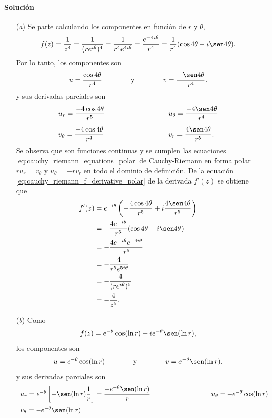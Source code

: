 \documentclass[a4paper]{report}
\begin{document}
\paragraph{Solución} 
\begin{enumerate}
 \item[(\textit{a})] Se parte calculando los componentes en función de \(r\) y \(\theta\),
  \[
   f(z)=\frac{1}{z^4}=\frac{1}{(re^{i\theta})^4}=\frac{1}{r^4e^{4i\theta}}
    =\frac{e^{-4i\theta}}{r^4}=\frac{1}{r^4}(\cos4\theta-i\sen4\theta).
  \]
  Por lo tanto, los componentes son
  \[
  u=\frac{\cos4\theta}{r^4}
  \qquad\qquad\textrm{y}\qquad\qquad
  v=\frac{-\sen4\theta}{r^4}.
 \]
 y sus derivadas parciales son 
 \[
 \begin{array}{ll}
  u_r=\dfrac{-4\cos4\theta}{r^5}
  \qquad\qquad\qquad\qquad&
  u_\theta=\dfrac{-4\sen4\theta}{r^4}\\[\bigskipamount]
  v_\theta=\dfrac{-4\cos4\theta}{r^4}
  \qquad\qquad\qquad\qquad&
  v_r=\dfrac{4\sen4\theta}{r^5}.
 \end{array}
 \]
 Se observa que son funciones continuas y se cumplen las ecuaciones \ref{eq:cauchy_riemann_equations_polar} de Cauchy-Riemann en forma polar \(ru_r=v_\theta\) y \(u_\theta=-rv_r\) en todo el dominio de definición. De la ecuación \ref{eq:cauchy_riemann_f_derivative_polar} de la derivada \(f'(z)\) se obtiene que 
 \begin{align*}
  f'(z)&=e^{-i\theta}\left(-\frac{4\cos4\theta}{r^5}+i\frac{4\sen4\theta}{r^5}\right)\\
   &=-\frac{4e^{-i\theta}}{r^5}(\cos4\theta-i\sen4\theta)\\
   &=-\frac{4e^{-i\theta}e^{-4i\theta}}{r^5}\\
   &=-\frac{4}{r^5e^{5i\theta}}\\
   &=-\frac{4}{(re^{i\theta})^5}\\
   &=-\frac{4}{z^5}.
 \end{align*}
 \item[(\textit{b})] Como
 \[
  f(z)=e^{-\theta}\cos(\ln r)+ie^{-\theta}\sen(\ln r),
 \]
 los componentes son
 \[
  u=e^{-\theta}\cos(\ln r)
  \qquad\qquad\textrm{y}\qquad\qquad
  v=e^{-\theta}\sen(\ln r).
 \]
 y sus derivadas parciales son 
 \[
 \begin{array}{ll}
  u_r=e^{-\theta}\left[-\sen(\ln r)\dfrac{1}{r}\right]=\dfrac{-e^{-\theta}\sen(\ln r)}{r}
  \qquad\qquad\qquad\qquad&
  u_\theta=-e^{-\theta}\cos(\ln r)\\[\bigskipamount]
  v_\theta=-e^{-\theta}\sen(\ln r)
  \qquad\qquad\qquad\qquad&

\end{array}\]
\end{enumerate}
\end{document}
